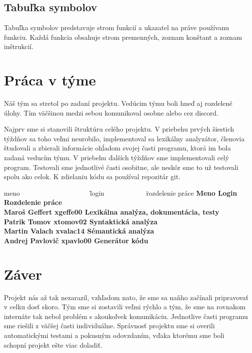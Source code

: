 \documentclass[a4paper, 11pt]{article}
\begin{document}
    
    
    \subsection{Tabuľka symbolov}
    
    Tabuľka symbolov predstavuje strom funkcií a ukazatel na práve používanu funkciu. Každá funkcia obsahuje strom premenných, zoznam konštant a zoznam inštrukcií.
    
    \section{Práca v týme}
    
    Náš tým sa stretol po zadaní projektu. Vedúcim týmu boli hneď aj rozdelené úlohy. Tím väčšinou medzi sebou komunikoval osobne alebo cez discord. 
    
    Najprv sme si stanovili štruktúru celého projektu. V priebehu prvých šiestich týždňov sa toho veľmi neurobilo, implementoval sa lexikálny analyzátor, členovia študovali a zbierali informácie ohĺadom svojej časti programu, ktorá im bola zadaná veducím týmu. V priebehu ďalších týždňov sme implementovali celý program. Testovali sme jednotlivé časti osobitne, ale neskôr sme to už testovali spolu ako celok. K zdielaniu kódu sa používal repozitár git.
    
    \begin{tabbing}
    meno ~~~~~~~~~~~~~~~~~~~~\= login ~~~~~~~~~~~
    \= rozdelenie práce \kill
    \bfseries Meno \>
    \bfseries Login \>
    \bfseries Rozdelenie práce \\[2mm]
    Maroš Geffert \> xgeffe00 \> Lexikálna analýza, dokumentácia, testy \\
    Patrik Tomov \> xtomov02 \> Syntaktická analýza\\
    Martin Valach \> xvalac14 \> Sémantická analýza \\
    Andrej Pavlovič \> xpavlo00 \> Generátor kódu
    \end{tabbing}


    \section{Záver}
    
    Projekt nás až tak nezarazil, vzhľadom nato, že sme sa naňho začínali pripravovať v celku dosť skoro. Tým sme si zostavili veľmi rýchlo a tým, že sme na rovnakom internáte tak nebol problém s akoukoľvek komunikáciu. Jednotlive časti programu sme riešili z väčšej časti individuálne.
    Správnosť projektu sme si overili automatickými testami a pokusným odovzdaním, vďaka ktorému sme boli schopní projekt ešte viac doladiť.
    
\end{document}
